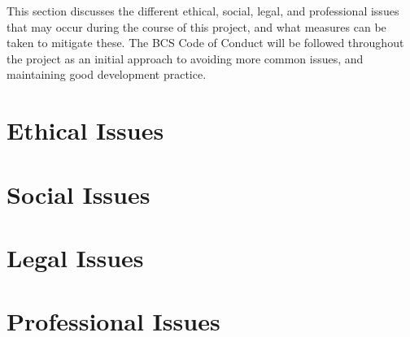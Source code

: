 This section discusses the different ethical, social, legal, and professional issues that may occur during the course of this project, and what measures can be taken to mitigate these. The BCS Code of Conduct \cite{bcs_code_of_conduct} will be followed throughout the project as an initial approach to avoiding more common issues, and maintaining good development practice.

\section{Ethical Issues}
\label{ethical_issues}


\section{Social Issues}
\label{social_issues}


\section{Legal Issues}
\label{legal_issues}


\section{Professional Issues}
\label{professional_issues}


